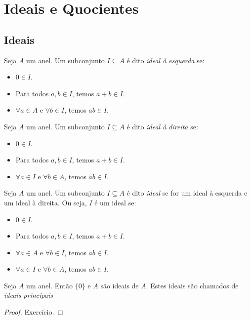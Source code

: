 \chapter{Ideais e Quocientes}
\section{Ideais}
\begin{definition}
    Seja $A$ um anel. Um subconjunto $I \subseteq A$ é dito \emph{ideal à esquerda} se:
    \begin{itemize}
        \item $0 \in I$.
        \item Para todos $a, b \in I$, temos $a+b\in I$.
        \item $\forall a \in A$ e $\forall b \in I$, temos $ab \in I$.
    \end{itemize}
\end{definition}

\begin{definition}
    Seja $A$ um anel. Um subconjunto $I \subseteq A$ é dito \emph{ideal à direita} se:
    \begin{itemize}
        \item $0 \in I$.
        \item Para todos $a, b \in I$, temos $a+b\in I$.
        \item $\forall a \in I$ e $\forall b \in A$, temos $ab \in I$.
    \end{itemize}
\end{definition}

\begin{definition}[Ideal]
    Seja $A$ um anel. Um subconjunto $I \subseteq A$ é dito \emph{ideal} se for um ideal à esquerda e um ideal à direita. Ou seja, $I$ é um ideal se:
    \begin{itemize}
        \item $0 \in I$.
        \item Para todos $a, b \in I$, temos $a+b\in I$.
        \item $\forall a \in A$ e $\forall b \in I$, temos $ab \in I$.
        \item $\forall a \in I$ e $\forall b \in A$, temos $ab \in I$.
    \end{itemize}
\end{definition}

\begin{prop}Seja $A$ um anel. Então $\{0\}$ e $A$ são ideais de $A$. Estes ideais são chamados de \emph{ideais principais}
\end{prop}
\begin{proof}
    Exercício.
\end{proof}

